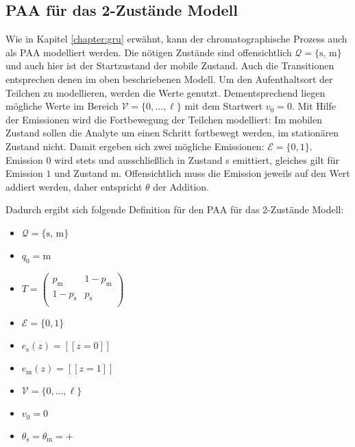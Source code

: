 
\subsection{PAA für das 2-Zustände Modell}
Wie in Kapitel \ref{chapter:gru} erwähnt, kann der chromatographische Prozess auch als PAA modelliert werden. Die nötigen Zustände sind offensichtlich $\mathcal{Q} = \{\text{s, m}\}$ und auch hier ist der Startzustand der mobile Zustand. Auch die Transitionen entsprechen denen im oben beschriebenen Modell. Um den Aufenthaltsort der Teilchen zu modellieren, werden die Werte genutzt. Dementsprechend liegen mögliche Werte im Bereich $\mathcal{V} = \{0, \ldots, \ell\}$ mit dem Startwert $v_0 = 0$. Mit Hilfe der Emissionen wird die Fortbewegung der Teilchen modelliert: Im mobilen Zustand sollen die Analyte um einen Schritt fortbewegt werden, im stationären Zustand nicht. Damit ergeben sich zwei mögliche Emissionen: $\mathcal{E} = \{0, 1\}$. Emission $0$ wird stets und ausschließlich in Zustand s emittiert, gleiches gilt für Emission $1$ und Zustand m. Offensichtlich muss die Emission jeweils auf den Wert addiert werden, daher entspricht $\theta$ der Addition.

Dadurch ergibt sich folgende Definition für den PAA für das 2-Zustände Modell:
\begin{itemize}
 \item $ \mathcal{Q} = \{\text{s, m}\} $
 \item $ q_0 = \text{m}$
 \item $ T = \begin{pmatrix}
	  p_{\text{m}} & 1-p_{\text{m}}  \\
	  1-p_{\text{s}} & p_{\text{s}} \\
	\end{pmatrix} $
 \item $\mathcal{E} = \{0, 1\}$
 \item $ e_{\text{s}}(z)= [\![ z=0 ]\!]$
 \item $ e_{\text{m}}(z) = [\![ z=1 ]\!]$ %
 \item $   \mathcal{V} = \{0, \ldots, \ell\}$
 \item $ v_0 = 0 $
 \item $ \theta_{\text{s}} = \theta_{\text{m}} = + $
\end{itemize}
 
